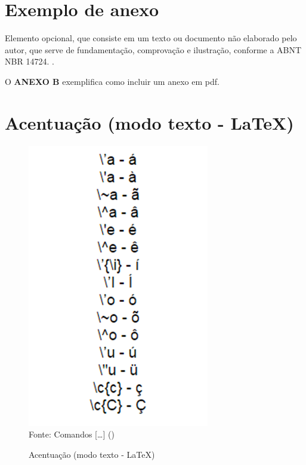 \begin{anexosenv}

\partanexos

\chapter{Exemplo de anexo}
Elemento opcional, que consiste em um texto ou documento não elaborado pelo autor, que serve de fundamentação, comprovação e ilustração, conforme a ABNT NBR 14724. \cite{nbr14724}.

O \textbf{ANEXO B} exemplifica como incluir um anexo em pdf.

\chapter{Acentuação (modo texto - \LaTeX)}
\begin{figure}[H]
	\begin{center}
	\caption{\label{fig_anexob}Acentuação (modo texto - \LaTeX)}
	\includegraphics[scale=1.0]{USPSC-img/USPSC-AcentuacaoLaTeX.png} \\
	Fonte: Comandos [\ldots]  (\citeyear{comandos})
	\end{center}	
\end{figure}


\end{anexosenv}
